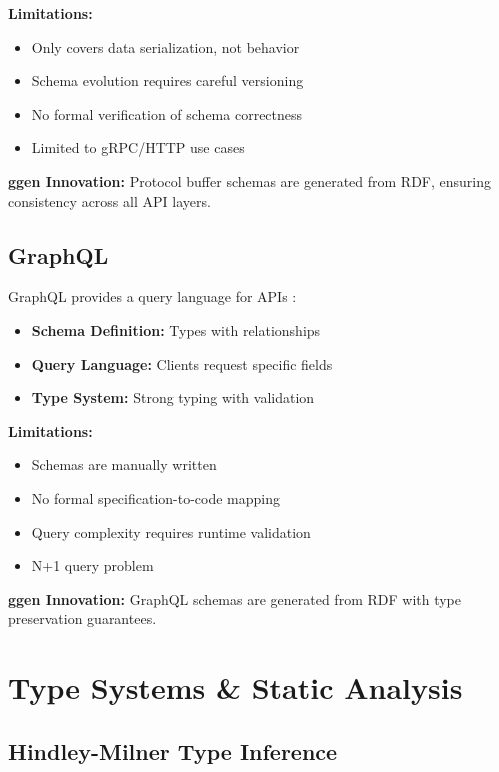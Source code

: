 \textbf{Limitations:}
\begin{itemize}
    \item Only covers data serialization, not behavior
    \item Schema evolution requires careful versioning
    \item No formal verification of schema correctness
    \item Limited to gRPC/HTTP use cases
\end{itemize}

\textbf{ggen Innovation:} Protocol buffer schemas are generated from RDF, ensuring consistency across all API layers.

\subsection{GraphQL}

GraphQL provides a query language for APIs \cite{graphql2018}:

\begin{itemize}
    \item \textbf{Schema Definition:} Types with relationships
    \item \textbf{Query Language:} Clients request specific fields
    \item \textbf{Type System:} Strong typing with validation
\end{itemize}

\textbf{Limitations:}
\begin{itemize}
    \item Schemas are manually written
    \item No formal specification-to-code mapping
    \item Query complexity requires runtime validation
    \item N+1 query problem
\end{itemize}

\textbf{ggen Innovation:} GraphQL schemas are generated from RDF with type preservation guarantees.

\section{Type Systems \& Static Analysis}

\subsection{Hindley-Milner Type Inference}


